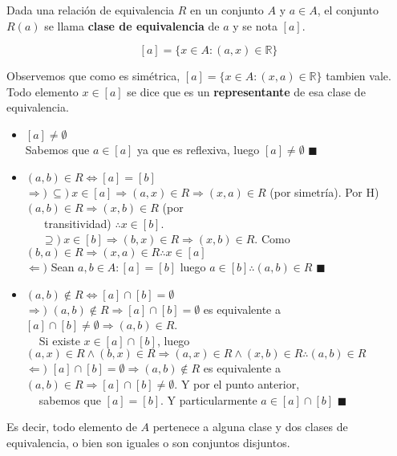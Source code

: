 \documentclass[11pt,a4paper]{article}
\newcommand*{\QEDA}{\null\nobreak\hfill\ensuremath{\blacksquare}}
\begin{document}
\noindent Dada una relaci\'on de equivalencia $R$ en un conjunto $A$ y $a \in A$, el conjunto $R(a)$ se llama \textbf{clase de equivalencia} de $a$ y se nota $[a]$.

$$[a] = \{ x \in A : (a,x) \in \mathbb{R} \}$$

\noindent Observemos que como es sim\'etrica, $[a] = \{ x \in A : (x,a) \in \mathbb{R} \}$ tambien vale. Todo elemento $x \in [a]$ se dice que es un \textbf{representante} de esa clase de equivalencia.

\begin{itemize}
\item $[a] \not = \emptyset$\\
Sabemos que $a \in [a]$ ya que es reflexiva, luego $[a] \not = \emptyset$ \QEDA
\item $(a,b) \in R \iff [a]=[b]$\\
$\Rightarrow)\ \subseteq)\ x \in [a] \Rightarrow (a,x) \in R \Rightarrow (x,a) \in R$ (por simetr\'ia). Por H) $(a,b) \in R \Rightarrow (x,b) \in R$ (por \\ \indent $\ \ \ \ \ \ $ transitividad) $\therefore x \in [b]$.\\
\indent $\ \ \ $ $ \ \ \supseteq)\ x \in [b] \Rightarrow (b,x) \in R \Rightarrow (x,b) \in R$. Como $(b,a) \in R \Rightarrow (x,a) \in R \therefore x \in [a]$\\
$\Leftarrow)$ Sean $a,b \in A : [a]=[b]$ luego $a \in [b] \therefore (a,b) \in R$ \QEDA
\item $(a,b) \not \in R \iff [a]\cap[b] = \emptyset$\\
$\Rightarrow)$ $(a,b) \not \in R \Rightarrow [a]\cap[b] = \emptyset$ es equivalente a $[a]\cap[b] \not = \emptyset \Rightarrow (a,b) \in R$.\\
\indent $\ \ \ \ $ Si existe $x \in [a]\cap[b]$, luego $(a,x) \in R \land (b,x) \in R \Rightarrow (a,x) \in R \land (x,b) \in R \therefore (a,b) \in R$\\
$\Leftarrow)$ $[a]\cap[b] = \emptyset \Rightarrow (a,b) \not \in R$ es equivalente a $(a,b) \in R \Rightarrow [a]\cap[b] \not = \emptyset$. Y por el punto anterior,\\ \indent $\ \ \ \ $ sabemos que $[a]=[b]$. Y particularmente $a \in [a]\cap[b]$ \QEDA
\end{itemize}

\noindent Es decir, todo elemento de $A$ pertenece a alguna clase y dos clases de equivalencia, o bien son iguales o son conjuntos disjuntos.\\
\end{document}
